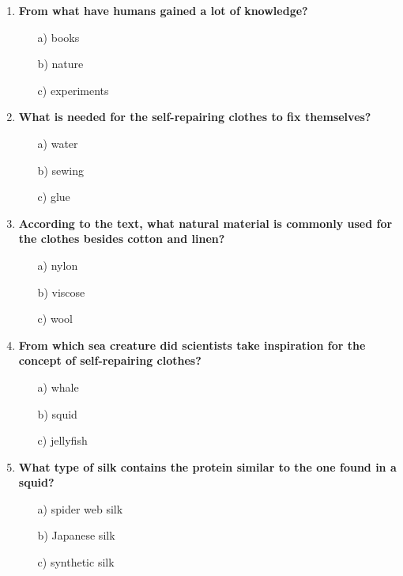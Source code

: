 \begin{enumerate}
      \item \textbf{From what have humans gained a lot of knowledge?}
            \begin{enumerate}
                  \item[a)] books
                  \item[b)] nature
                  \item[c)] experiments
            \end{enumerate}
      \item \textbf{What is needed for the self-repairing clothes to fix themselves?}
            \begin{enumerate}
                  \item[a)] water
                  \item[b)] sewing
                  \item[c)] glue
            \end{enumerate}
      \item \textbf{According to the text, what natural material is commonly used for the clothes besides cotton and linen?}
            \begin{enumerate}
                  \item[a)] nylon
                  \item[b)] viscose
                  \item[c)] wool
            \end{enumerate}
      \item \textbf{From which sea creature did scientists take inspiration for the concept of self-repairing clothes?}
            \begin{enumerate}
                  \item[a)] whale
                  \item[b)] squid
                  \item[c)] jellyfish
            \end{enumerate}
      \item \textbf{What type of silk contains the protein similar to the one found in a squid?}
            \begin{enumerate}
                  \item[a)] spider web silk
                  \item[b)] Japanese silk
                  \item[c)] synthetic silk
            \end{enumerate}

\end{enumerate}
